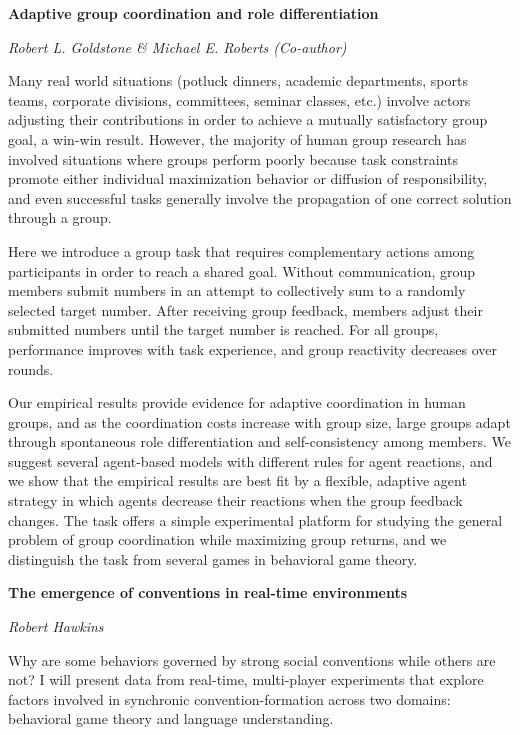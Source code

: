 \documentclass[10pt,letterpaper]{article}
\begin{document}
\begin{center}\textbf{Adaptive group coordination and role differentiation}\end{center}
\begin{center}\emph{Robert L. Goldstone \& Michael E. Roberts (Co-author)}\end{center}

Many real world situations (potluck dinners, academic departments, sports teams, corporate divisions, committees, seminar classes, etc.) involve actors adjusting their contributions in order to achieve a mutually satisfactory group goal, a win-win result.  However, the majority of human group research has involved situations where groups perform poorly because task constraints promote either individual maximization behavior or diffusion of responsibility, and even successful tasks generally involve the propagation of one correct solution through a group.  

Here we introduce a group task that requires complementary actions among participants in order to reach a shared goal.  Without communication, group members submit numbers in an attempt to collectively sum to a randomly selected target number.  After receiving group feedback, members adjust their submitted numbers until the target number is reached.  For all groups, performance improves with task experience, and group reactivity decreases over rounds.  

Our empirical results provide evidence for adaptive coordination in human groups, and as the coordination costs increase with group size, large groups adapt through spontaneous role differentiation and self-consistency among members.  We suggest several agent-based models with different rules for agent reactions, and we show that the empirical results are best fit by a flexible, adaptive agent strategy in which agents decrease their reactions when the group feedback changes.  The task offers a simple experimental platform for studying the general problem of group coordination while maximizing group returns, and we distinguish the task from several games in behavioral game theory.

\begin{center}\textbf{The emergence of conventions in real-time environments}\end{center}
\begin{center}\emph{Robert Hawkins}\end{center}

Why are some behaviors governed by strong social conventions while others are not? I will present data from real-time, multi-player experiments that explore factors involved in synchronic convention-formation across two domains: behavioral game theory and language understanding. 
\end{document}
